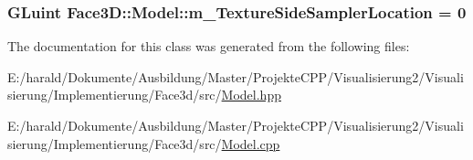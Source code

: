 \subsubsection[{\texorpdfstring{m\+\_\+\+Texture\+Side\+Sampler\+Location}{m_TextureSideSamplerLocation}}]{\setlength{\rightskip}{0pt plus 5cm}G\+Luint Face3\+D\+::\+Model\+::m\+\_\+\+Texture\+Side\+Sampler\+Location = 0\hspace{0.3cm}{\ttfamily [private]}}\hypertarget{class_face3_d_1_1_model_a206d2e11c046acd3bbbb8a6ce8aa4586}{}\label{class_face3_d_1_1_model_a206d2e11c046acd3bbbb8a6ce8aa4586}


The documentation for this class was generated from the following files\+:\begin{DoxyCompactItemize}
\item 
E\+:/harald/\+Dokumente/\+Ausbildung/\+Master/\+Projekte\+C\+P\+P/\+Visualisierung2/\+Visualisierung/\+Implementierung/\+Face3d/src/\hyperlink{_model_8hpp}{Model.\+hpp}\item 
E\+:/harald/\+Dokumente/\+Ausbildung/\+Master/\+Projekte\+C\+P\+P/\+Visualisierung2/\+Visualisierung/\+Implementierung/\+Face3d/src/\hyperlink{_model_8cpp}{Model.\+cpp}\end{DoxyCompactItemize}
